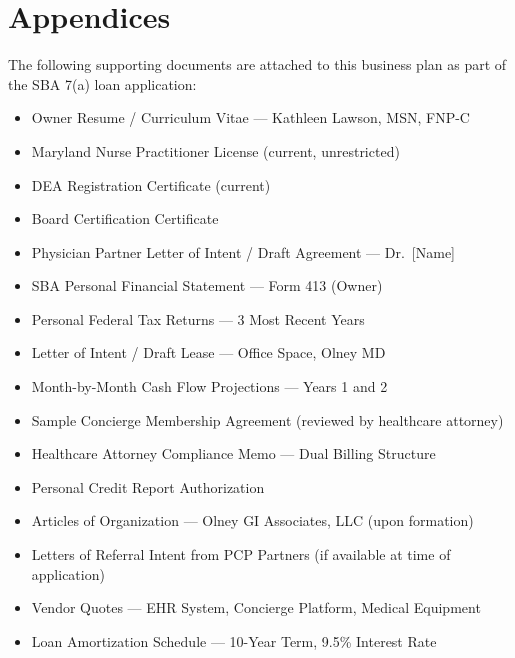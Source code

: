 \documentclass[11pt,letterpaper]{article}
\newcommand{\ownername}{Kathleen Lawson}
\newcommand{\ownercredentials}{MSN, FNP-C}
\begin{document}
\newpage

\section{Appendices}

The following supporting documents are attached to this business plan as part of the SBA 7(a) loan application:

\begin{itemize}
  \item[\textbf{A.}] Owner Resume / Curriculum Vitae --- \ownername, \ownercredentials
  \item[\textbf{B.}] Maryland Nurse Practitioner License (current, unrestricted)
  \item[\textbf{C.}] DEA Registration Certificate (current)
  \item[\textbf{D.}] Board Certification Certificate
  \item[\textbf{E.}] Physician Partner Letter of Intent / Draft Agreement --- Dr.~[Name]
  \item[\textbf{F.}] SBA Personal Financial Statement --- Form 413 (Owner)
  \item[\textbf{G.}] Personal Federal Tax Returns --- 3 Most Recent Years
  \item[\textbf{H.}] Letter of Intent / Draft Lease --- Office Space, Olney MD
  \item[\textbf{I.}] Month-by-Month Cash Flow Projections --- Years 1 and 2
  \item[\textbf{J.}] Sample Concierge Membership Agreement (reviewed by healthcare attorney)
  \item[\textbf{K.}] Healthcare Attorney Compliance Memo --- Dual Billing Structure
  \item[\textbf{L.}] Personal Credit Report Authorization
  \item[\textbf{M.}] Articles of Organization --- Olney GI Associates, LLC (upon formation)
  \item[\textbf{N.}] Letters of Referral Intent from PCP Partners (if available at time of application)
  \item[\textbf{O.}] Vendor Quotes --- EHR System, Concierge Platform, Medical Equipment
  \item[\textbf{P.}] Loan Amortization Schedule --- 10-Year Term, 9.5\% Interest Rate
\end{itemize}
\end{document}
